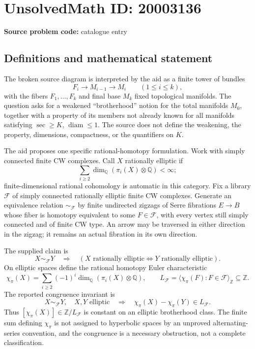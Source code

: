 \documentclass[11pt]{article}
\newcommand{\Z}{\mathbb{Z}}
\newcommand{\Q}{\mathbb{Q}}
\begin{document}
\section*{UnsolvedMath ID: 20003136}
\textbf{Source problem code:} catalogue entry
\subsection{Definitions and mathematical statement}
The broken source diagram is interpreted by the aid as a finite tower of bundles
\[
 F_i\longrightarrow M_{i-1}\longrightarrow M_i\qquad(1\leq i\leq k),
\]
with the fibers \(F_1,\ldots,F_k\) and final base \(M_k\) fixed topological manifolds. The question asks for a weakened ``brotherhood'' notion for the total manifolds \(M_0\), together with a property of its members not already known for all manifolds satisfying \(\sec\geq K\), \(\operatorname{diam}\leq1\). The source does not define the weakening, the property, dimensions, compactness, or the quantifiers on \(K\).

The aid proposes one specific rational-homotopy formulation. Work with simply connected finite CW complexes. Call \(X\) rationally elliptic if
\[
 \sum_{i\geq2}\dim_\Q(\pi_i(X)\otimes\Q)<\infty;
\]
finite-dimensional rational cohomology is automatic in this category. Fix a library \(\mathcal F\) of simply connected rationally elliptic finite CW complexes. Generate an equivalence relation \(\sim_{\mathcal F}\) by finite undirected zigzags of Serre fibrations \(E\to B\) whose fiber is homotopy equivalent to some \(F\in\mathcal F\), with every vertex still simply connected and of finite CW type. An arrow may be traversed in either direction in the zigzag; it remains an actual fibration in its own direction.

The supplied claim is
\[
 X\sim_{\mathcal F}Y\quad\Longrightarrow\quad
 (X\text{ rationally elliptic}\Longleftrightarrow Y\text{ rationally elliptic}).
\]
On elliptic spaces define the rational homotopy Euler characteristic
\[
 \chi_\pi(X)=\sum_{i\geq2}(-1)^i\dim_\Q(\pi_i(X)\otimes\Q),
 \qquad L_{\mathcal F}=\langle\chi_\pi(F):F\in\mathcal F\rangle_\Z\subseteq\Z.
\]
The reported congruence invariant is
\[
 X\sim_{\mathcal F}Y,\quad X,Y\text{ elliptic}
 \quad\Longrightarrow\quad
 \chi_\pi(X)-\chi_\pi(Y)\in L_{\mathcal F}.
\]
Thus \([\chi_\pi(X)]\in\Z/L_{\mathcal F}\) is constant on an elliptic brotherhood class. The finite sum defining \(\chi_\pi\) is not assigned to hyperbolic spaces by an unproved alternating-series convention, and the congruence is a necessary obstruction, not a complete classification.
\end{document}

